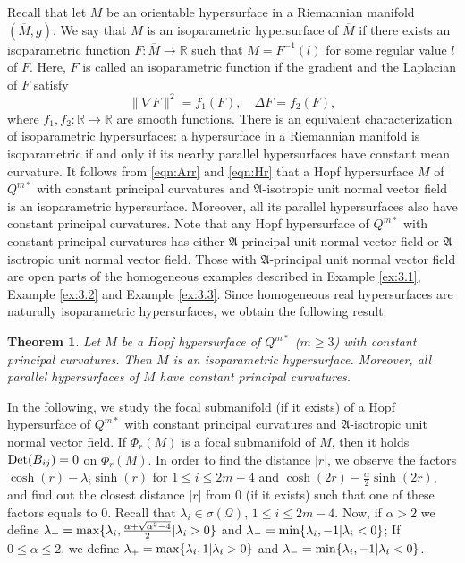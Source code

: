 \documentclass[reqno]{amsart}%
\newtheorem{theorem}{Theorem}[section]   %
\theoremstyle{definition}
\numberwithin{equation}{section}
\begin{document}
Recall that let $M$ be an orientable hypersurface in a Riemannian manifold $(\overline{M}, g)$.
We say that $M$ is an isoparametric hypersurface of $\overline{M}$ if 
there exists an isoparametric function $F:\overline{M} \rightarrow \mathbb{R}$ such that $M=F^{-1}(l)$ 
for some regular value $l$ of $F$. Here, $F$ is called an isoparametric function
if the gradient and the Laplacian of $F$ satisfy
$$
\|\nabla F\|^{2}=f_1(F), \quad \Delta F=f_2(F),
$$
where $f_1, f_2: \mathbb{R} \rightarrow \mathbb{R}$ are smooth functions. 
There is an equivalent characterization of isoparametric hypersurfaces: a hypersurface in a Riemannian manifold is isoparametric if and only if its nearby parallel hypersurfaces have constant mean curvature.
It follows from \eqref{eqn:Arr} and \eqref{eqn:Hr} that a Hopf hypersurface $M$ of $Q^{m*}$ with constant principal curvatures and $\mathfrak{A}$-isotropic unit normal vector field is an isoparametric hypersurface. Moreover, all its parallel hypersurfaces also have constant principal curvatures. 
Note that any Hopf hypersurface of $Q^{m*}$ with constant principal curvatures has either $\mathfrak{A}$-principal unit normal vector field or $\mathfrak{A}$-isotropic unit normal vector field. Those with  $\mathfrak{A}$-principal unit normal vector field are open parts of the homogeneous examples described in Example \ref{ex:3.1}, Example \ref{ex:3.2} and Example \ref{ex:3.3}. Since homogeneous real hypersurfaces are naturally isoparametric hypersurfaces, we obtain the following result:
\begin{theorem}\label{thm:4.2w}
Let $M$ be a Hopf hypersurface of $Q^{m*}$ ($m\geq3$) with constant principal curvatures. Then $M$ is an isoparametric hypersurface. Moreover, all parallel hypersurfaces of $M$ have constant principal curvatures.
\end{theorem}




In the following, we study the focal submanifold (if it exists) of a Hopf hypersurface of $Q^{m*}$ with constant principal curvatures and $\mathfrak{A}$-isotropic unit normal vector field.
If $\Phi_r(M)$ is a focal
submanifold of $M$, then it holds ${\rm Det}(B_{ij})=0$ on $\Phi_r(M)$. In order to find the distance $|r|$, we observe the factors $\cosh(r)-\lambda_i\sinh(r)$ for $1\leq i\leq2m-4$ and $\cosh(2r)-\frac{\alpha}{2}\sinh(2r)$,
and find out the closest distance $|r|$ from $0$ (if it exists) such that one of these factors equals to $0$.
Recall that $\lambda_i\in \sigma(\mathcal{Q})$, $1\leq i\leq2m-4$.
Now, if $\alpha>2$ we define
$\lambda_+={\rm max}\{\lambda_i,\frac{\alpha+\sqrt{\alpha^2-4}}{2}|\lambda_i>0\}$ and $\lambda_-={\rm min}\{\lambda_i,-1|\lambda_i<0\}$; If $0\leq\alpha\leq2$, we define
$\lambda_+={\rm max}\{\lambda_i,1|\lambda_i>0\}$ and $\lambda_-={\rm min}\{\lambda_i,-1|\lambda_i<0\}$.
\end{document}
